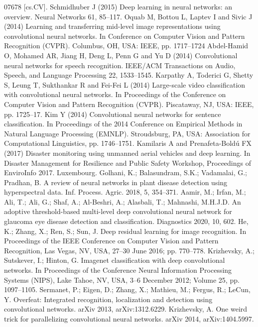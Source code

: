 \documentclass[11pt]{report}
\begin{document}
\begin{thebibliography}{100}
	07678 [cs.CV].
	 Schmidhuber J (2015) Deep learning in neural networks: an overview. Neural
	Networks 61, 85–117.
	 Oquab M, Bottou L, Laptev I and Sivic J (2014) Learning and transferring
	mid-level image representations using convolutional neural networks. In
	Conference on Computer Vision and Pattern Recognition (CVPR).
	Columbus, OH, USA: IEEE, pp. 1717–1724
	 Abdel-Hamid O, Mohamed AR, Jiang H, Deng L, Penn G and Yu D (2014)
	Convolutional neural networks for speech recognition. IEEE/ACM
	Transactions on Audio, Speech, and Language Processing 22, 1533–1545.
	 Karpathy A, Toderici G, Shetty S, Leung T, Sukthankar R and Fei-Fei L
	(2014) Large-scale video classification with convolutional neural networks.
	In Proceedings of the Conference on Computer Vision and Pattern
	Recognition (CVPR). Piscataway, NJ, USA: IEEE, pp. 1725–17.
	 Kim Y (2014) Convolutional neural networks for sentence classification. In
	Proceedings of the 2014 Conference on Empirical Methods in Natural
	Language Processing (EMNLP). Stroudsburg, PA, USA: Association for
	Computational Linguistics, pp. 1746–1751.
	 Kamilaris A and Prenafeta-Boldú FX (2017) Disaster monitoring using
	unmanned aerial vehicles and deep learning. In Disaster Management for
	Resilience and Public Safety Workshop, Proceedings of EnviroInfo 2017.
	Luxembourg.
	 Golhani, K.; Balasundram, S.K.; Vadamalai, G.; Pradhan, B. A review of neural networks in plant disease detection using
	hyperspectral data. Inf. Process. Agric. 2018, 5, 354–371.
	 Aamir, M.; Irfan, M.; Ali, T.; Ali, G.; Shaf, A.; Al-Beshri, A.; Alasbali, T.; Mahnashi, M.H.J.D. An adoptive threshold-based
	multi-level deep convolutional neural network for glaucoma eye disease detection and classification. Diagnostics 2020, 10, 602.
	 He, K.; Zhang, X.; Ren, S.; Sun, J. Deep residual learning for image recognition. In Proceedings of the IEEE Conference on
	Computer Vision and Pattern Recognition, Las Vegas, NV, USA, 27–30 June 2016; pp. 770–778.
	 Krizhevsky, A.; Sutskever, I.; Hinton, G. Imagenet classification with deep convolutional networks. In Proceedings of the
	Conference Neural Information Processing Systems (NIPS), Lake Tahoe, NV, USA, 3–6 December 2012; Volume 25, pp. 1097–1105.
	 Sermanet, P.; Eigen, D.; Zhang, X.; Mathieu, M.; Fergus, R.; LeCun, Y. Overfeat: Integrated recognition, localization and detection
	using convolutional networks. arXiv 2013, arXiv:1312.6229.
	 Krizhevsky, A. One weird trick for parallelizing convolutional neural networks. arXiv 2014, arXiv:1404.5997.

\end{thebibliography}
\end{document}
